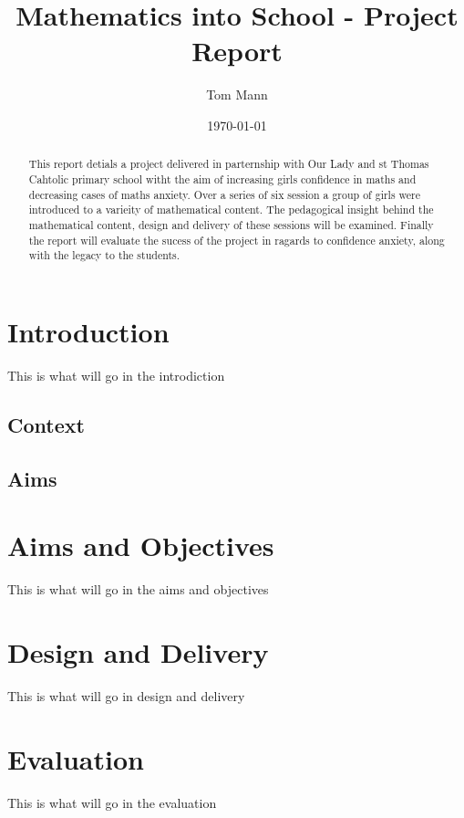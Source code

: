 \documentclass[11pt, a4paper, notitlepage]{article}
\title{Mathematics into School - Project Report}
\author{Tom Mann}
\date{\today}
\begin{document}
\maketitle

\begin{abstract}
    This report detials a project delivered in parternship with Our Lady and st Thomas Cahtolic primary school witht the aim of increasing girls confidence in maths and decreasing cases of maths anxiety. Over a series of six session a group of girls were introduced to a varieity of mathematical content. The pedagogical insight behind the mathematical content, design and delivery of these sessions will be examined. Finally the report will evaluate the sucess of the project in ragards to confidence anxiety, along with the legacy to the students.
\end{abstract}

\clearpage

\tableofcontents

\clearpage

\section{Introduction}
This is what will go in the introdiction

\subsection{Context}

\subsection{Aims}

\section{Aims and Objectives}
This is what will go in the aims and objectives

\section{Design and Delivery}

This is what will go in design and delivery

\section{Evaluation}
This is what will go in the evaluation
\end{document}
